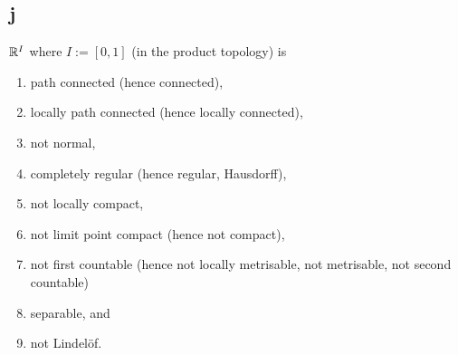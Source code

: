 
\subsection*{j}
  $\mathbb{R}^I$ where $I := [0, 1]$ (in the product topology) is
  \begin{enumerate}
  \item path connected (hence connected),
  \item locally path connected (hence locally connected),
  \item not normal,
  \item completely regular (hence regular, Hausdorff),
  \item not locally compact,
  \item not limit point compact (hence not compact),
  \item not first countable (hence not locally metrisable, not metrisable, not second countable)
  \item separable, and 
  \item not Lindel\"of.
  \end{enumerate}


